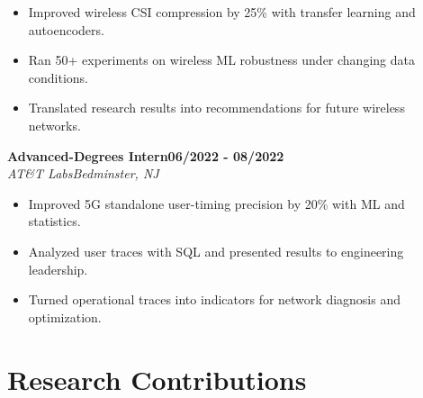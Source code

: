 \documentclass[10pt,letterpaper]{extarticle}
\newcommand{\role}[4]{%
  \Needspace{4\baselineskip}\textbf{#1}\hfill\textbf{#2}\\[-1pt]
  \textit{#3}\hfill\textit{#4}\par}
\begin{document}
\begin{itemize}
\item Improved wireless CSI compression by 25\% with transfer learning and autoencoders.
\item Ran 50+ experiments on wireless ML robustness under changing data conditions.
\item Translated research results into recommendations for future wireless networks.
\end{itemize}
\vspace{1pt}
\role{Advanced-Degrees Intern}{06/2022 - 08/2022}{AT\&T Labs}{Bedminster, NJ}
\begin{itemize}
\item Improved 5G standalone user-timing precision by 20\% with ML and statistics.
\item Analyzed user traces with SQL and presented results to engineering leadership.
\item Turned operational traces into indicators for network diagnosis and optimization.
\end{itemize}
\vspace{1pt}
\section{Research Contributions}
\end{document}

